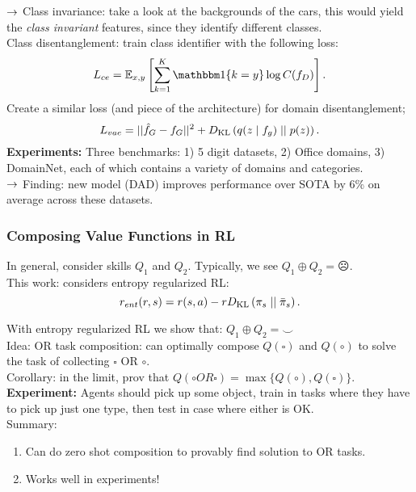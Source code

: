 $\rightarrow$ Class invariance: take a look at the backgrounds of the cars, this would yield the {\it class invariant} features, since they identify different classes. \\

Class disentanglement: train class identifier with the following loss:
\[
L_{ce} = \bE_{x,y} \left[\sum_{k=1}^K \indic\{k=y\} \log C(f_D)\right].
\]
Create a similar loss (and piece of the architecture) for domain disentanglement;
\[
L_{vae} = ||\hat{f}_G - f_G||^2 + D_{\text{KL}}\left(q(z \mid f_g) \mid \mid p(z)\right).
\]
{\bf Experiments:} Three benchmarks: 1) 5 digit datasets, 2) Office domains, 3) DomainNet, each of which contains a variety of domains and categories. \\

$\rightarrow$ Finding: new model (DAD) improves performance over SOTA by 6\% on average across these datasets.

\spacerule


\subsubsection{Composing Value Functions in RL}


In general, consider skills $Q_1$ and $Q_2$. Typically, we see $Q_1 \oplus Q_2 = \frownie$. \\

This work: considers entropy regularized RL:
\[
r_{ent}(r,s) = r(s,a) - r D_{\text{KL}}\left(\pi_s \mid \mid \bar{\pi}_s\right).
\]


With entropy regularized RL we show that: $Q_1 \oplus Q_2 = \smile$ \\

Idea: OR task composition: can optimally compose $Q(\square)$ and $Q(\circ)$ to solve the task of collecting $\square$ OR $\circ$. \\

Corollary: in the limit, prov that $Q(\circ OR \square) = \max\{Q(\circ), Q(\square)\}$. \\

{\bf Experiment:} Agents should pick up some object, train in tasks where they have to pick up just one type, then test in case where either is OK. \\

Summary:
\begin{enumerate}
    \item Can do zero shot composition to provably find solution to OR tasks.
    \item Works well in experiments!
\end{enumerate}

